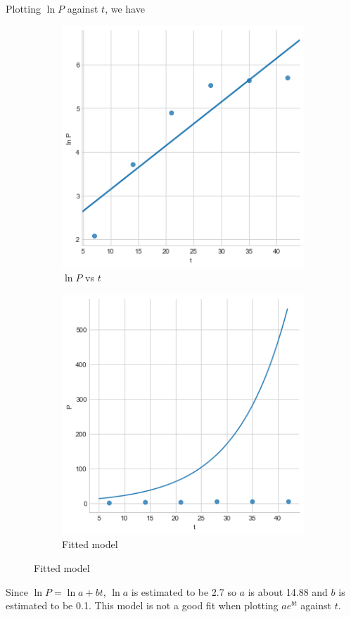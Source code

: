 \documentclass[10pt]{report}
\begin{document}
\begin{enumerate}
\begin{enumerate}[a.]
		Plotting $\ln{P}$ against $t$, we have
		\begin{figure}[H]
			\centering
			\begin{subfigure}[b]{.4\linewidth}
				\caption{$\ln{P}$ vs $t$}
				\includegraphics[width=\linewidth]{s3_1/5b.png}
			\end{subfigure}%
			\begin{subfigure}[b]{.4\linewidth}
				\caption{Fitted model}
				\includegraphics[width=\linewidth]{s3_1/5bo.png}
			\end{subfigure}
		\end{figure}
		Since $\ln{P} = \ln{a} + bt$, $\ln{a}$ is estimated to be 2.7 so $a$ is about 14.88 and $b$ is estimated to be 0.1. This model is not a good fit when plotting $ a e^{bt}$ against $t$.
	\end{enumerate}


\end{enumerate}
\end{document}
